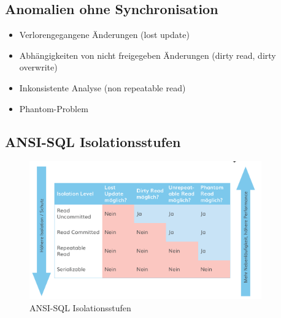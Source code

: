 \documentclass[a4paper]{article}
\begin{document}
\subsection{Anomalien ohne Synchronisation}
\begin{itemize}
    \item Verlorengegangene Änderungen (lost update)
    \item Abhängigkeiten von nicht freigegeben Änderungen (dirty read, dirty overwrite)
    \item Inkonsistente Analyse (non repeatable read)
    \item Phantom-Problem
\end{itemize}

\subsection{ANSI-SQL Isolationsstufen}
\begin{figure} [htp]
    \centering
    \includegraphics[width=10cm]{images/ANSI-Isolationsstufen.png}
    \caption{ANSI-SQL Isolationsstufen}
    \label{fig:Isolationsstufen}
\end{figure}
\end{document}
